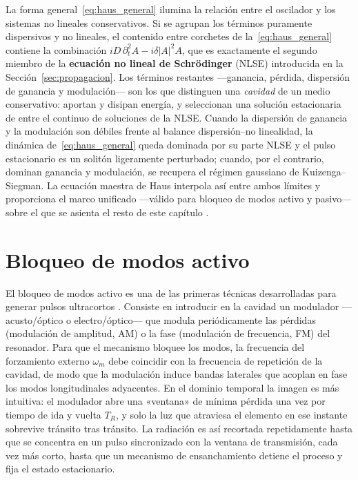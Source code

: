 La forma general~\eqref{eq:haus_general} ilumina la relación entre el oscilador y
los sistemas no lineales conservativos. Si se agrupan los términos puramente
dispersivos y no lineales, el contenido entre corchetes de
la~\eqref{eq:haus_general} contiene la combinación
$iD\,\partial_t^2 A - i\delta|A|^2 A$, que es exactamente el segundo miembro de la
\textbf{ecuación no lineal de Schrödinger} (NLSE) introducida en la
Sección~\ref{sec:propagacion}. Los términos restantes —ganancia, pérdida,
dispersión de ganancia y modulación— son los que distinguen una \emph{cavidad}
de un medio conservativo: aportan y disipan energía, y seleccionan una solución
estacionaria de entre el continuo de soluciones de la NLSE. Cuando la dispersión
de ganancia y la modulación son débiles frente al balance dispersión--no
linealidad, la dinámica de~\eqref{eq:haus_general} queda dominada por su parte
NLSE y el pulso estacionario es un solitón ligeramente perturbado; cuando, por el
contrario, dominan ganancia y modulación, se recupera el régimen gaussiano de
Kuizenga--Siegman. La ecuación maestra de Haus interpola así entre ambos límites
y proporciona el marco unificado —válido para bloqueo de modos activo y pasivo—
sobre el que se asienta el resto de este capítulo \cite{Haus2000,Keller2022}.



\section{Bloqueo de modos activo}
\label{sec:ml_activo}

El bloqueo de modos activo es una de las primeras técnicas desarrolladas para
generar pulsos ultracortos \cite{KuizengaSiegman1970,Haus1975forced}. Consiste en
introducir en la cavidad un modulador —acusto\-/óptico o electro\-/óptico— que
modula periódicamente las pérdidas (modulación de amplitud, AM) o la fase
(modulación de frecuencia, FM) del resonador. Para que el mecanismo bloquee los
modos, la frecuencia del forzamiento externo $\omega_m$ debe coincidir con la
frecuencia de repetición de la cavidad, de modo que la modulación induce bandas
laterales que acoplan en fase los modos longitudinales adyacentes. En el dominio
temporal la imagen es más intuitiva: el modulador abre una «ventana» de mínima
pérdida una vez por tiempo de ida y vuelta $T_R$, y solo la luz que atraviesa el
elemento en ese instante sobrevive tránsito tras tránsito. La radiación es así
recortada repetidamente hasta que se concentra en un pulso sincronizado con la
ventana de transmisión, cada vez más corto, hasta que un mecanismo de
ensanchamiento detiene el proceso y fija el estado estacionario.

